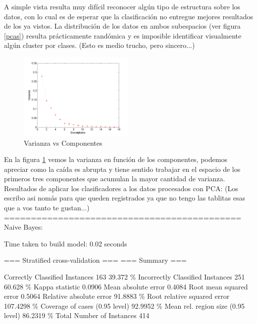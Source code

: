 \documentclass[12pt,a4paper,titlepage]{report}
\begin{document}
A simple vista resulta muy difícil reconocer algún tipo de estructura sobre los datos, con lo cual es de esperar que la clasificación no entregue mejores resultados de los ya vistos. La distribución de los datos en ambos subespacios (ver figura \ref{pcas}) resulta prácticamente randómica y es imposible identificar visualmente algún cluster por clases. (Esto es medio trucho, pero sincero...)\\

\begin{figure}
	\vspace{-20pt}
	\begin{center}
		\includegraphics[width=0.5\textwidth]{pics/varianzaPCA}
	\end{center}
	\vspace{-20pt}
	\caption{Varianza vs Componentes}
	\label{varianzaPCA}
	\vspace{-10pt}
\end{figure}

En la figura \ref{varianzaPCA} vemos la varianza en función de los componentes, podemos apreciar como la caída es abrupta y tiene sentido trabajar en el espacio de los primeros tres componentes que acumulan la mayor cantidad de varianza.\\

Resultados de aplicar los clasificadores a los datos procesados con PCA: (Los escribo asi nomás para que queden registrados ya que no tengo las tablitas esas que a vos tanto te gustan...)\\

============================================\\
Naive Bayes:

Time taken to build model: 0.02 seconds

=== Stratified cross-validation ===
=== Summary ===

Correctly Classified Instances         163               39.372  \%
Incorrectly Classified Instances       251               60.628  \%
Kappa statistic                          0.0906
Mean absolute error                      0.4084
Root mean squared error                  0.5064
Relative absolute error                 91.8883 \%
Root relative squared error            107.4298 \%
Coverage of cases (0.95 level)          92.9952 \%
Mean rel. region size (0.95 level)      86.2319 \%
Total Number of Instances              414     
\end{document}
